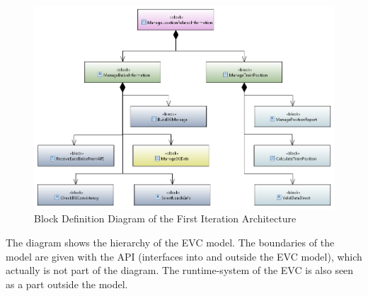 \documentclass{template/openetcs_report}
\begin{document}
\begin{figure}[h]
\centering
\includegraphics[scale=0.6]{../images/FunctionalArchitectureBDD.png}
\caption{Block Definition Diagram of the First Iteration Architecture}
\end{figure}

The diagram shows the hierarchy of the EVC model. The boundaries of the model are given with the API (interfaces into and outside the EVC model), which actually is not part of the diagram. The runtime-system of the EVC is also seen as a part outside the model.
\end{document}
